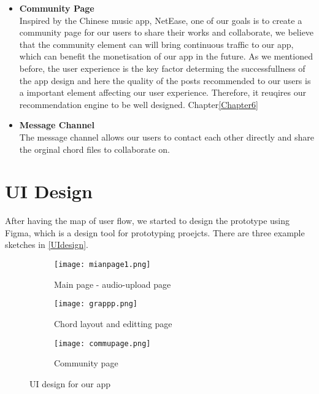 \begin{itemize}
\item \textbf{Community Page}
\\Inspired by the Chinese music app, NetEase, one of our goals is to create a community page for our users to share their works and collaborate, 
we believe that the community element can will bring continuous traffic to our app, which can benefit the monetisation of our app in the future.
As we mentioned before, the user experience is the key factor determing the successfullness of the app design and here the quality of the posts recommended to our users is a important element affecting our user experience. 
Therefore, it reuqires our recommendation engine to be well designed. Chapter\ref{Chapter6}

\item \textbf{Message Channel}
\\The message channel allows our users to contact each other directly and share the orginal chord files to collaborate on.

\end{itemize}




\section{UI Design}
After having the map of user flow, we started to design the prototype using Figma, which is a design tool for prototyping proejcts. 
There are three example sketches in \autoref{UIdesign}. 

\begin{figure}[ht]
    \label{UIdesign}
     \centering
     \hspace{16mm}
     \begin{subfigure}[b]{0.2\textwidth}
         \centering
         \texttt{[image: mianpage1.png]}
         \caption{Main page - audio-upload page}
         \label{Mainpage}
     \end{subfigure}
     \hfill
     \begin{subfigure}[b]{0.2\textwidth}
         \centering
         \texttt{[image: grappp.png]}
         \caption{Chord layout and editting page}
         \label{chordedit}
     \end{subfigure}
     \hfill
     \begin{subfigure}[b]{0.2\textwidth}
         \centering
         \texttt{[image: commupage.png]}
         \caption{Community page}
         \label{Community page}
     \end{subfigure}
     \hspace{16mm}
        \caption{UI design for our app}
        \label{fig:three graphs}
\end{figure}

